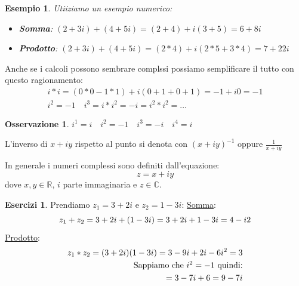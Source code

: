 \documentclass{article}
\newtheorem{exmp}{Esempio}[section]
\theoremstyle{definition}
\newtheorem{exer}{Esercizi}[section]
\newtheorem{oss}{Osservazione}[section]
\begin{document}
\begin{exmp}
Utiiziamo un esempio numerico:
        \begin{itemize}
                \item \textbf{Somma}:  $ (2 + 3i) + (4 + 5i) = (2 + 4) + i(3 + 5) = 6 + 8i $  
                \item \textbf{Prodotto}: $(2 + 3i) + (4 + 5i) = (2 * 4) + i(2*5 + 3*4) = 7 + 22i$ 
        \end{itemize}
\end{exmp}

Anche se i calcoli possono sembrare complssi possiamo semplificare il tutto con questo ragionamento:
\begin{align*}
        i * i = (0*0 - 1*1) + i(0+1 + 0+1) = -1+ i0 = -1 \\
        i^2 = -1 \quad i^3 = i * i^2 = -i = i^2 * i^2 = \ldots 
\end{align*}

\begin{tcolorbox}
\begin{oss}
        $\boxed{ i^1 = i \quad i^2 = -1 \quad i^3 = -i \quad i^4 = i}$
\end{oss}
\end{tcolorbox}
L'inverso di $x + iy$ rispetto al punto si denota con ${(x + iy)}^{-1}$ oppure $\frac{1}{x + iy}$ \newline

In generale i numeri complessi sono definiti dall'equazione:
\begin{equation*}
        \boxed{z = x + iy}
\end{equation*}
dove $ x,y \in \mathbb{R} $, $ i $ parte immaginaria e $ z \in \mathbb{C} $.   


\newpage
\begin{exer}
       Prendiamo $ z_1 = 3 + 2i$  e $ z_2 = 1 - 3i $:\newline
       \underline{Somma}:
       \begin{equation*}
                z_1 + z_2 = 3 + 2i + (1 - 3i) = 3 + 2i + 1 - 3i = 4 - i\\
                2 
       \end{equation*}
       \underline{Prodotto}:
       \begin{align*}
               z_1 * z_2 = (3 + 2i)(1 - 3i) = 3 - 9i + 2i - 6{i}^{2} = 3 \\
               \mbox{Sappiamo che $ i^2 = -1 $ quindi:} \\
               = 3 - 7i + 6 = 9 - 7i 
       \end{align*}
\end{exer}
\end{document}
